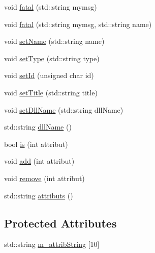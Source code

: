 \begin{DoxyCompactItemize}
void \hyperlink{classObject_aad5a16aac7516ce65bd5ec02ab07fc80}{fatal} (std::string mymsg)
\item 
void \hyperlink{classObject_ae62acd3d09f716220f75f252dc38bc9a}{fatal} (std::string mymsg, std::string name)
\item 
void \hyperlink{classObject_ae30fea75683c2d149b6b6d17c09ecd0c}{setName} (std::string name)
\item 
void \hyperlink{classObject_aae534cc9d982bcb9b99fd505f2e103a5}{setType} (std::string type)
\item 
void \hyperlink{classObject_a398fe08cba594a0ce6891d59fe4f159f}{setId} (unsigned char id)
\item 
void \hyperlink{classObject_a89557dbbad5bcaa02652f5d7fa35d20f}{setTitle} (std::string title)
\item 
void \hyperlink{classObject_a870c5af919958c2136623b2d7816d123}{setDllName} (std::string dllName)
\item 
std::string \hyperlink{classObject_a2e3947f2870094c332d7454117f3ec63}{dllName} ()
\item 
bool \hyperlink{classAttrib_a704f26af560909ad22065083bb7d4c34}{is} (int attribut)
\item 
void \hyperlink{classAttrib_a235f773af19c900264a190b00a3b4ad7}{add} (int attribut)
\item 
void \hyperlink{classAttrib_a7d4ef7e32d93cb287792b87b857e79f3}{remove} (int attribut)
\item 
std::string \hyperlink{classAttrib_aee7bbf16b144887f196e1341b24f8a26}{attributs} ()
\end{DoxyCompactItemize}
\subsection*{Protected Attributes}
\begin{DoxyCompactItemize}
\item 
std::string \hyperlink{classAttrib_a3414521d7a82476e874b25a5407b5e63}{m\_\-attribString} \mbox{[}10\mbox{]}
\end{DoxyCompactItemize}
